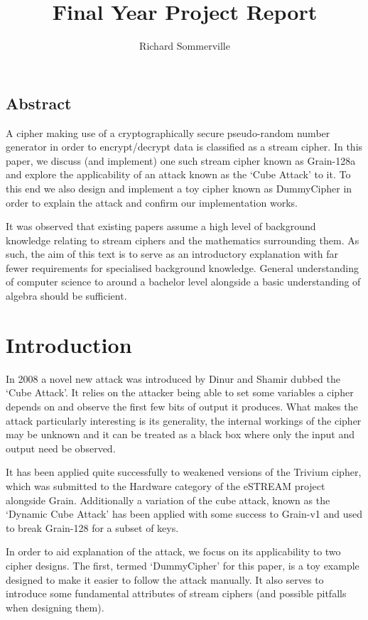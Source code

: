 \documentclass{report}
\title{Final Year Project Report}
\author{Richard Sommerville}
\date{}
\let\Oldsection\section
\renewcommand{\section}{\FloatBarrier\Oldsection}
\begin{document}
\maketitle
\tableofcontents
\section{Abstract}
A cipher making use of a cryptographically secure pseudo-random number generator in order to encrypt/decrypt data is classified as a stream cipher\cite{streamcipherDef}. In this paper, we discuss (and implement) one such stream cipher known as Grain-128a and explore the applicability of an attack known as the `Cube Attack' to it. To this end we also design and implement a toy cipher known as DummyCipher in order to explain the attack and confirm our implementation works.

It was observed that existing papers assume a high level of background knowledge relating to stream ciphers and the mathematics surrounding them\cite{DinurShamir2009}\cite{DynamicCube128}\cite{MobiusTransform}. As such, the aim of this text is to serve as an introductory explanation with far fewer requirements for specialised background knowledge. General understanding of computer science to around a bachelor level alongside a basic understanding of algebra should be sufficient.
\chapter{Introduction}
In 2008 a novel new attack was introduced by Dinur and Shamir\cite{DinurShamir2009} dubbed the `Cube Attack'. It relies on the attacker being able to set some variables a cipher depends on and observe the first few bits of output it produces. What makes the attack particularly interesting is its generality, the internal workings of the cipher may be unknown and it can be treated as a black box where only the input and output need be observed.

It has been applied quite successfully to weakened versions of the Trivium cipher\cite{DinurShamir2009}\cite{MobiusTransform}, which was submitted to the Hardware category of the eSTREAM project alongside Grain\cite{eStreamPort}. Additionally a variation of the cube attack, known as the `Dynamic Cube Attack' has been applied with some success to Grain-v1\cite{cryptoeprint:2010:570} and used to break Grain-128 for a subset of keys\cite{DynamicCube128}.

In order to aid explanation of the attack, we focus on its applicability to two cipher designs. The first, termed `DummyCipher' for this paper, is a toy example designed to make it easier to follow the attack manually. It also serves to introduce some fundamental attributes of stream ciphers (and possible pitfalls when designing them).
\end{document}
